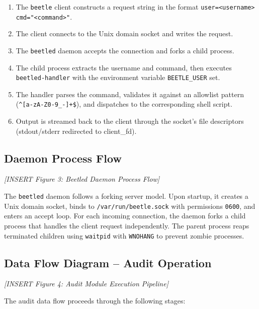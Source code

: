 \begin{enumerate}[noitemsep]
    \item The \texttt{beetle} client constructs a request string in the format \texttt{user=<username> cmd="<command>"}.
    \item The client connects to the Unix domain socket and writes the request.
    \item The \texttt{beetled} daemon accepts the connection and forks a child process.
    \item The child process extracts the username and command, then executes \texttt{beetled-handler} with the environment variable \texttt{BEETLE\_USER} set.
    \item The handler parses the command, validates it against an allowlist pattern (\texttt{\^{}[a-zA-Z0-9\_-]+\$}), and dispatches to the corresponding shell script.
    \item Output is streamed back to the client through the socket's file descriptors (stdout/stderr redirected to client\_fd).
\end{enumerate}

\subsection{Daemon Process Flow}

\vspace{0.5cm}
\noindent\textit{[INSERT Figure 3: Beetled Daemon Process Flow]}
\vspace{0.5cm}

The \texttt{beetled} daemon follows a forking server model. Upon startup, it creates a Unix domain socket, binds to \texttt{/var/run/beetle.sock} with permissions \texttt{0600}, and enters an accept loop. For each incoming connection, the daemon forks a child process that handles the client request independently. The parent process reaps terminated children using \texttt{waitpid} with \texttt{WNOHANG} to prevent zombie processes.

\subsection{Data Flow Diagram -- Audit Operation}

\vspace{0.5cm}
\noindent\textit{[INSERT Figure 4: Audit Module Execution Pipeline]}
\vspace{0.5cm}

The audit data flow proceeds through the following stages:


